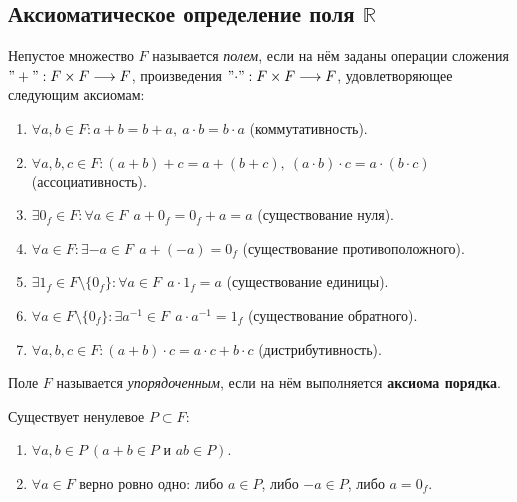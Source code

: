 \subsection{Аксиоматическое определение поля $\mathbb{R}$}

    \begin{definition}
        Непустое множество $F$ называется \textit{полем}, если на нём заданы операции сложения $"+": F \times F \longrightarrow F$, произведения $"\textbf{$\cdot$}": F \times F \longrightarrow F$, удовлетворяющее следующим аксиомам:
        \begin{enumerate}
            \item $\forall a, b \in F: a+b = b+a, \  a \cdot b = b \cdot a$ (коммутативность).
            \item $\forall a, b, c \in F: (a + b) + c = a + (b + c), \ (a \cdot b) \cdot c = a \cdot (b \cdot c)$ (ассоциативность).
            \item $\exists 0_{f} \in F: \forall a \in F \ \  a + 0_{f} = 0_{f} + a = a$ (существование нуля).
            \item $\forall a \in F: \exists -a \in F \ \  a + (-a) = 0_{f}$ (существование противоположного).
            \item $\exists 1_{f} \in F \setminus \{0_{f}\}: \forall a \in F \ \  a \cdot 1_{f} = a$ (существование единицы).
            \item $\forall a \in F \setminus \{0_{f}\}: \exists a^{-1} \in F \ \ a \cdot a^{-1} = 1_{f}$ (существование обратного).
            \item $\forall a, b, c \in F: (a + b) \cdot c = a \cdot c + b \cdot c$ (дистрибутивность).
        \end{enumerate}
    \end{definition}
    
    \begin{definition}
        Поле $F$ называется \textit{упорядоченным}, если на нём выполняется \textbf{аксиома порядка}.
    \end{definition}
    
    Существует ненулевое $P \subset F$:
    
    \begin{enumerate}
        \item $\forall a,b \in P \ (a+b \in P \text{ и } ab \in P)$.
        \item $\forall a \in F$ верно ровно одно: либо $a \in P$, либо $-a \in P$, либо $a = 0_{f}$.
    \end{enumerate}
    
